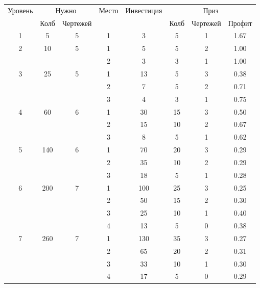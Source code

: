 \begin{longtable}[c]{|c|c|c|c|c|c|c|c|}
    \hline
    \multirow{ 2}{*}{\small Уровень} &
    \multicolumn{2}{|c|}{\small Нужно} &
    \multirow{ 2}{*}{\small Место} & 
    \multirow{ 2}{*}{\small Инвестиция} & 
    \multicolumn{3}{|c|}{\small Приз} \\\cline{2-3}\cline{6-8}
    &
    {\small Колб} & 
    {\small Чертежей} & 
    & &
    {\small Колб} & 
    {\small Чертежей} & 
    {\small Профит}
    \\\hline\endhead
    \multirow{1}{*}{1} & \multirow{1}{*}{5} & \multirow{1}{*}{5} & 1 & 3 & 5 & 1 & 1.67 \\\hline
    \multirow{2}{*}{2} & \multirow{2}{*}{10} & \multirow{2}{*}{5} & 1 & 5 & 5 & 2 & 1.00 \\\cline{4-8}
    & & & 2 & 3 & 3 & 1 & 1.00 \\\hline
    \multirow{3}{*}{3} & \multirow{3}{*}{25} & \multirow{3}{*}{5} & 1 & 13 & 5 & 3 & 0.38 \\\cline{4-8}
    & & & 2 & 7 & 5 & 2 & 0.71 \\\cline{4-8}
    & & & 3 & 4 & 3 & 1 & 0.75 \\\hline
    \multirow{3}{*}{4} & \multirow{3}{*}{60} & \multirow{3}{*}{6} & 1 & 30 & 15 & 3 & 0.50 \\\cline{4-8}
    & & & 2 & 15 & 10 & 2 & 0.67 \\\cline{4-8}
    & & & 3 & 8 & 5 & 1 & 0.62 \\\hline
    \multirow{3}{*}{5} & \multirow{3}{*}{140} & \multirow{3}{*}{6} & 1 & 70 & 20 & 3 & 0.29 \\\cline{4-8}
    & & & 2 & 35 & 10 & 2 & 0.29 \\\cline{4-8}
    & & & 3 & 18 & 5 & 1 & 0.28 \\\hline
    \multirow{4}{*}{6} & \multirow{4}{*}{200} & \multirow{4}{*}{7} & 1 & 100 & 25 & 3 & 0.25 \\\cline{4-8}
    & & & 2 & 50 & 15 & 2 & 0.30 \\\cline{4-8}
    & & & 3 & 25 & 10 & 1 & 0.40 \\\cline{4-8}
    & & & 4 & 13 & 5 & 0 & 0.38 \\\hline
    \multirow{4}{*}{7} & \multirow{4}{*}{260} & \multirow{4}{*}{7} & 1 & 130 & 35 & 3 & 0.27 \\\cline{4-8}
    & & & 2 & 65 & 20 & 2 & 0.31 \\\cline{4-8}
    & & & 3 & 33 & 10 & 1 & 0.30 \\\cline{4-8}
    & & & 4 & 17 & 5 & 0 & 0.29 \\\hline

\end{longtable}
